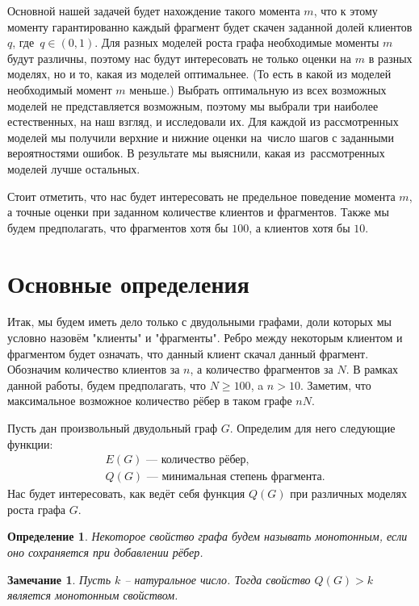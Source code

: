 \documentclass{matmex-diploma-custom}
\newcommand{\geqs}{\geqslant}
\newtheorem{note}{Замечание}
\newtheorem{define}{Определение}
\theoremstyle{named}
\begin{document}
Основной нашей задачей будет нахождение такого момента $m$, что к этому моменту гарантированно каждый фрагмент 
будет скачен заданной долей клиентов $q$, где~$q \in (0, 1)$. 
Для разных моделей роста графа необходимые моменты $m$ будут различны, 
поэтому нас будут интересовать не только оценки на $m$ в разных моделях, но и то, какая из моделей оптимальнее. 
(То есть в какой из моделей необходимый момент $m$ меньше.) 
Выбрать оптимальную из всех возможных моделей не представляется возможным, 
поэтому мы выбрали три наиболее естественных, на наш взгляд, и исследовали их. 
Для каждой из рассмотренных моделей мы получили верхние и нижние оценки на~число шагов с заданными вероятностями ошибок. 
В результате мы выяснили, какая из~рассмотренных моделей лучше остальных.

Стоит отметить, что нас будет интересовать не предельное поведение момента $m$, а точные оценки при заданном количестве клиентов
и фрагментов. Также мы будем предполагать, что фрагментов хотя бы $100$, а клиентов хотя бы $10$.


\newpage
\section*{Основные определения}
Итак, мы будем иметь дело только с двудольными графами, доли которых мы условно назовём "клиенты" и "фрагменты".
Ребро между некоторым клиентом и фрагментом будет означать, что данный клиент скачал данный фрагмент.
Обозначим количество клиентов за $n$, а количество фрагментов за $N$. 
В рамках данной работы, будем предполагать, что $N \geqs 100$, a $n > 10$.
Заметим, что максимальное возможное количество рёбер в таком графе $nN$.

Пусть дан произвольный двудольный граф $G$. Определим для него следующие функции:
\begin{align*}
&E(G) \text{ --- количество рёбер,}\\
&Q(G) \text{ --- минимальная степень фрагмента.}
\end{align*}
Нас будет интересовать, как ведёт себя функция $Q(G)$ при различных моделях роста графа $G$.

\begin{define}
Некоторое свойство графа будем называть монотонным, если оно сохраняется при добавлении рёбер.
\end{define}

\begin{note} \label{note1}
Пусть $k$ -- натуральное число. Тогда свойство $Q(G) > k$ является монотонным свойством.
\end{note}
\end{document}

